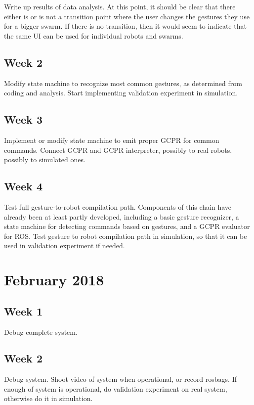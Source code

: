 Write up results of data analysis.
At this point, it should be clear that there either is or is not a transition point where the user changes the gestures they use for a bigger swarm. 
If there is no transition, then it would seem to indicate that the same UI can be used for individual robots and swarms. 

\subsection{Week 2}

Modify state machine to recognize most common gestures, as determined from coding and analysis. 
Start implementing validation experiment in simulation. 

\subsection{Week 3}

Implement or modify state machine to emit proper GCPR for common commands. 
Connect GCPR and GCPR interpreter, possibly to real robots, possibly to simulated ones. 
 
\subsection{Week 4}

Test full gesture-to-robot compilation path. Components of this chain have already been at least partly developed, including a basic gesture recognizer, a state machine for detecting commands based on gestures, and a GCPR evaluator for ROS.
Test gesture to robot compilation path in simulation, so that it can be used in validation experiment if needed. 

\section{February 2018}

\subsection{Week 1}

Debug complete system. 

\subsection{Week 2}

Debug system. 
Shoot video of system when operational, or record rosbags. 
If enough of system is operational, do validation experiment on real system, otherwise do it in simulation. 

